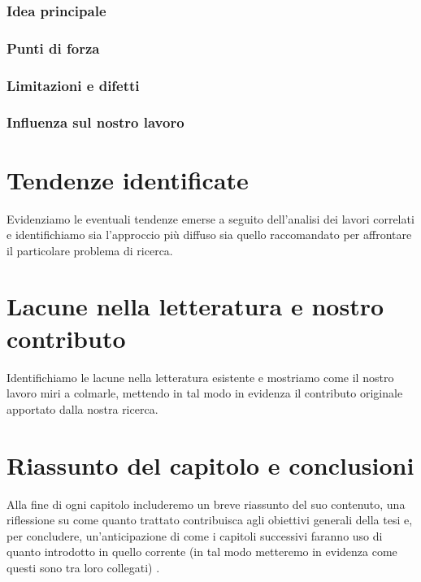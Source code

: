 \subsubsection{Idea principale}
\subsubsection{Punti di forza}
\subsubsection{Limitazioni e difetti}
\subsubsection{Influenza sul nostro lavoro}

\section{Tendenze identificate}

Evidenziamo le eventuali tendenze emerse a seguito dell'analisi dei lavori correlati e identifichiamo sia l'approccio più diffuso sia quello raccomandato per affrontare il particolare problema di ricerca.

\section{Lacune nella letteratura e nostro contributo}

Identifichiamo le lacune nella letteratura esistente e mostriamo come il nostro lavoro miri a colmarle, mettendo in tal modo in evidenza il contributo originale apportato dalla nostra ricerca.

\section{Riassunto del capitolo e conclusioni}

Alla fine di ogni capitolo includeremo un breve riassunto del suo contenuto, una riflessione su come quanto trattato contribuisca agli obiettivi generali della tesi e, per concludere, un'anticipazione di come i capitoli successivi faranno uso di quanto introdotto in quello corrente (in tal modo metteremo in evidenza come questi sono tra loro collegati) \cite{zobel2015writing}.